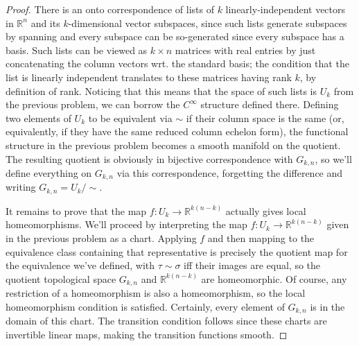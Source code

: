 \documentclass{article}
\begin{document}
\begin{proof}
  There is an onto correspondence of lists of $k$ linearly-independent vectors in $\mathbb{R}^{n}$ and its $k$-dimensional vector subspaces,
  since such lists generate subspaces by spanning and every subspace can be so-generated since every subspace has a basis.
  Such lists can be viewed as $k \times n$ matrices with real entries by just concatenating the column vectors wrt. the standard basis;
  the condition that the list is linearly independent translates to these matrices having rank $k$, by definition of rank.
  Noticing that this means that the space of such lists is $U_k$ from the previous problem, we can borrow the $C^{\infty}$ structure defined there.
  Defining two elements of $U_{k}$ to be equivalent via $\sim$ if their column space is the same
  (or, equivalently, if they have the same reduced column echelon form), the functional structure in the previous problem
  becomes a smooth manifold on the quotient.
  The resulting quotient is obviously in bijective correspondence with $G_{k, n}$, so we'll define everything on $G_{k, n}$ via this correspondence,
  forgetting the difference and writing $G_{k, n} = U_{k} / \sim$.

  It remains to prove that the map $f: U_{k} \to \mathbb{R}^{k(n - k)}$ actually gives local homeomorphisms.
  We'll proceed by interpreting the map $f: U_{k} \to \mathbb{R}^{k(n - k)}$ given in the previous problem as a chart.
  Applying $f$ and then mapping to the equivalence class containing that representative
  is precisely the quotient map for the equivalence we've defined, with $\tau \sim \sigma$ iff their images are equal,
  so the quotient topological space $G_{k, n}$ and $\mathbb{R}^{k(n-k)}$ are homeomorphic.
  Of course, any restriction of a homeomorphism is also a homeomorphism, so the local homeomorphism condition is satisfied.
  Certainly, every element of $G_{k, n}$ is in the domain of this chart.
  The transition condition follows since these charts are invertible linear maps, making the transition functions smooth.
\end{proof}
\end{document}

